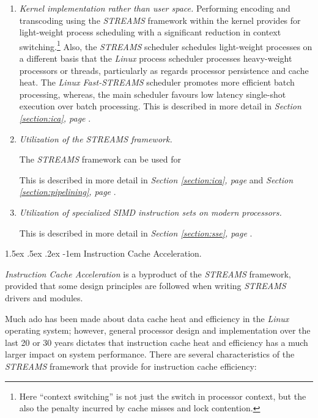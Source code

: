 \documentclass[letterpaper,final,notitlepage,twocolumn,10pt,twoside]{article}
\makeatletter
\let\normalsize = \small
\let\small = \footnotesize
\let\footnotesize = \scriptsize
\let\scriptsize = \tiny
\renewcommand\paragraph{\@startsection{paragraph}{4}{\z@}%
                                    {1.5ex \@plus .5ex \@minus .2ex}%
                                    {-1em}%
                                    {\normalfont\normalsize\bfseries\slshape}}
\makeatother
\begin{document}
\begin{enumerate}

\item{\it Kernel implementation rather than user space.} Performing encoding and
transcoding using the {\sl STREAMS} framework within the kernel provides for
light-weight process scheduling with a significant reduction in context
switching.\footnote{Here ``context switching'' is not just the switch in
processor context, but the also the penalty incurred by cache misses and lock
contention.}  Also, the {\sl STREAMS} scheduler schedules light-weight processes
on a different basis that the {\sl Linux} process scheduler processes
heavy-weight processors or threads, particularly as regards processor
persistence and cache heat.  The {\sl Linux Fast-STREAMS} scheduler promotes
more efficient batch processing, whereas, the main scheduler favours low latency
single-shot execution over batch processing.  This is described in more detail
in {\sl Section \ref{section:ica}, page \pageref{section:ica}}.

\item{\it Utilization of the {\sl STREAMS} framework.}

The {\sl STREAMS} framework can be used for 

This is described in more detail in {\sl Section \ref{section:ica}, page
\pageref{section:ica}} and {\sl Section \ref{section:pipelining}, page
\pageref{section:pipelining}}.

\item{\it Utilization of specialized SIMD instruction sets on modern
processors.}

This is described in more detail in {\sl Section \ref{section:sse}, page
\pageref{section:sse}}.

\end{enumerate}

\paragraph{Instruction Cache Acceleration.} \label{section:ica}

{\it Instruction Cache Acceleration} is a byproduct of the {\sl STREAMS}
framework, provided that some design principles are followed when writing {\sl
STREAMS} drivers and modules.

Much ado has been made about data cache heat and efficiency in the {\sl Linux}
operating system; however, general processor design and implementation over the
last 20 or 30 years dictates that instruction cache heat and efficiency has a
much larger impact on system performance.  There are several characteristics of
the {\sl STREAMS} framework that provide for instruction cache efficiency:
\end{document}
